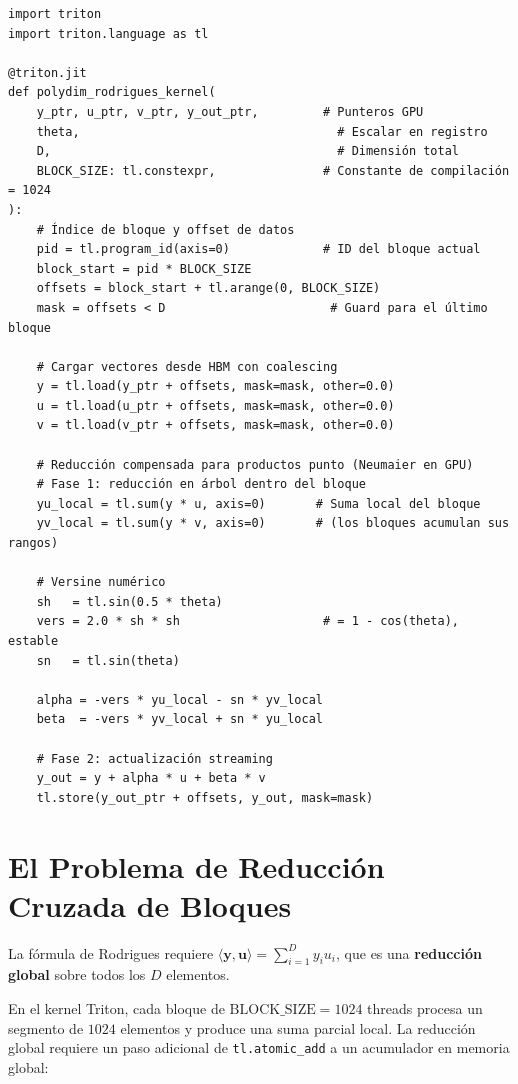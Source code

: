 \begin{verbatim}
import triton
import triton.language as tl

@triton.jit
def polydim_rodrigues_kernel(
    y_ptr, u_ptr, v_ptr, y_out_ptr,         # Punteros GPU
    theta,                                    # Escalar en registro
    D,                                        # Dimensión total
    BLOCK_SIZE: tl.constexpr,               # Constante de compilación = 1024
):
    # Índice de bloque y offset de datos
    pid = tl.program_id(axis=0)             # ID del bloque actual
    block_start = pid * BLOCK_SIZE
    offsets = block_start + tl.arange(0, BLOCK_SIZE)
    mask = offsets < D                       # Guard para el último bloque

    # Cargar vectores desde HBM con coalescing
    y = tl.load(y_ptr + offsets, mask=mask, other=0.0)
    u = tl.load(u_ptr + offsets, mask=mask, other=0.0)
    v = tl.load(v_ptr + offsets, mask=mask, other=0.0)

    # Reducción compensada para productos punto (Neumaier en GPU)
    # Fase 1: reducción en árbol dentro del bloque
    yu_local = tl.sum(y * u, axis=0)       # Suma local del bloque
    yv_local = tl.sum(y * v, axis=0)       # (los bloques acumulan sus rangos)

    # Versine numérico
    sh   = tl.sin(0.5 * theta)
    vers = 2.0 * sh * sh                    # = 1 - cos(theta), estable
    sn   = tl.sin(theta)

    alpha = -vers * yu_local - sn * yv_local
    beta  = -vers * yv_local + sn * yu_local

    # Fase 2: actualización streaming
    y_out = y + alpha * u + beta * v
    tl.store(y_out_ptr + offsets, y_out, mask=mask)
\end{verbatim}

\section{El Problema de Reducción Cruzada de Bloques}

La fórmula de Rodrigues requiere $\langle\mathbf{y}, \mathbf{u}\rangle = \sum_{i=1}^D y_i u_i$,
que es una \textbf{reducción global} sobre todos los $D$ elementos.

En el kernel Triton, cada bloque de $\text{BLOCK\_SIZE} = 1024$ threads procesa un
segmento de $1024$ elementos y produce una suma parcial local. La reducción global
requiere un paso adicional de \texttt{tl.atomic\_add} a un acumulador en memoria global:

